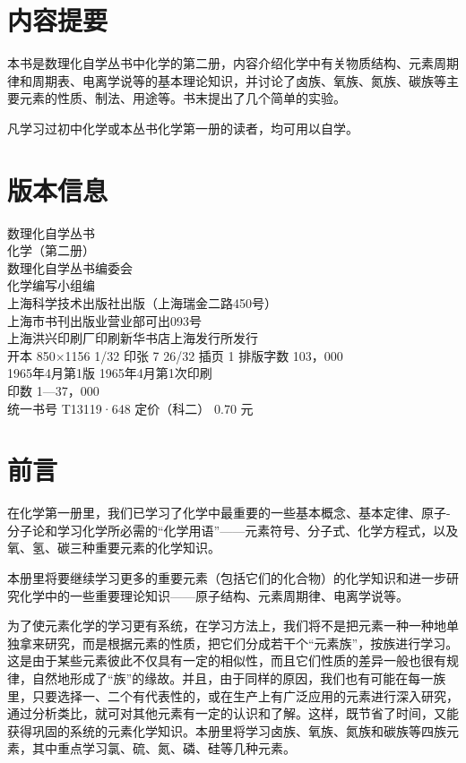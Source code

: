 \chapter*{内容提要}

本书是数理化自学丛书中化学的第二册，内容介绍化学中有关物质结构、元素周期律和周期表、电离学说等的基本理论知识，并讨论了卤族、氧族、氮族、碳族等主要元素的性质、制法、用途等。书末提出了几个简单的实验。

凡学习过初中化学或本丛书化学第一册的读者，均可用以自学。

\chapter*{版本信息}

数理化自学丛书\\
化学（第二册）\\
数理化自学丛书编委会\\
化学编写小组编\\
上海科学技术出版社出版（上海瑞金二路450号）\\
上海市书刊出版业营业部可出093号\\
上海洪兴印刷厂印刷新华书店上海发行所发行\\
开本 850×1156 1/32 印张 7 26/32 插页 1 排版字数 103，000\\
1965年4月第1版 1965年4月第1次印刷\\
印数 1---37，000\\
统一书号 T13119·648 定价（科二） 0.70 元

\chapter{前言}

在化学第一册里，我们已学习了化学中最重要的一些基本概念、基本定律、原子-分子论和学习化学所必需的``化学用语''------元素符号、分子式、化学方程式，以及氧、氢、碳三种重要元素的化学知识。

本册里将要继续学习更多的重要元素（包括它们的化合物）的化学知识和进一步研究化学中的一些重要理论知识------原子结构、元素周期律、电离学说等。

为了使元素化学的学习更有系统，在学习方法上，我们将不是把元素一种一种地单独拿来研究，而是根据元素的性质，把它们分成若干个``元素族''，按族进行学习。这是由于某些元素彼此不仅具有一定的相似性，而且它们性质的差异一般也很有规律，自然地形成了``族''的缘故。并且，由于同样的原因，我们也有可能在每一族里，只要选择一、二个有代表性的，或在生产上有广泛应用的元素进行深入研究，通过分析类比，就可对其他元素有一定的认识和了解。这样，既节省了时间，又能获得巩固的系统的元素化学知识。本册里将学习卤族、氧族、氮族和碳族等四族元素，其中重点学习氯、硫、氮、磷、硅等几种元素。

